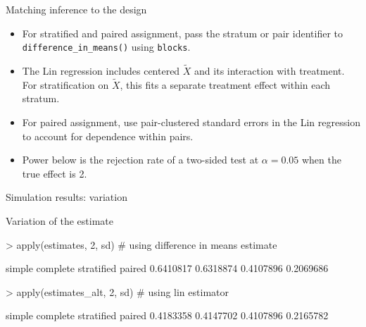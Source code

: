 \documentclass[xcolor={dvipsnames},handout]{beamer}
\begin{document}






\begin{frame}{Matching inference to the design}
\begin{itemize}
\item For stratified and paired assignment, pass the stratum or pair identifier to \texttt{difference\_in\_means()} using \texttt{blocks}.
\item The Lin regression includes centered $\tilde X$ and its interaction with treatment. For stratification on $\tilde X$, this fits a separate treatment effect within each stratum.
\item For paired assignment, use pair-clustered standard errors in the Lin regression to account for dependence within pairs.
\item Power below is the rejection rate of a two-sided test at $\alpha=0.05$ when the true effect is 2.
\end{itemize}
\end{frame}

\begin{frame}[fragile]{Simulation results: variation}

\scriptsize
Variation of the estimate
\begin{Schunk}
\begin{Sinput}
> apply(estimates, 2, sd) # using difference in means estimate
\end{Sinput}
\begin{Soutput}
    simple   complete stratified     paired
 0.6410817  0.6318874  0.4107896  0.2069686
\end{Soutput}
\begin{Sinput}
> apply(estimates_alt, 2, sd) # using lin estimator
\end{Sinput}
\begin{Soutput}
    simple   complete stratified     paired
 0.4183358  0.4147702  0.4107896  0.2165782
\end{Soutput}
\end{Schunk}

\end{frame}
\end{document}
